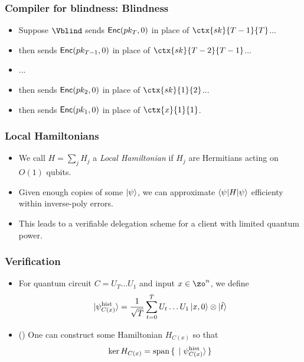 \documentclass{beamer}
\begin{document}
\begin{frame}
	\frametitle{Compiler for blindness: Blindness}
	\begin{itemize}[<+->]
		\item Suppose $\Vblind$ sends $\mathsf{Enc}(pk_T, 0)$ in place of $\ctx{sk}{T-1}{T}$...
		\item then sends $\mathsf{Enc}(pk_{T-1}, 0)$ in place of $\ctx{sk}{T-2}{T-1}$...
		\item ...
		\item then sends $\mathsf{Enc}(pk_2, 0)$ in place of $\ctx{sk}{1}{2}$...
		\item then sends $\mathsf{Enc}(pk_1, 0)$ in place of $\ctx{x}{1}{1}$.
	\end{itemize}
\end{frame}

\begin{frame}
	\frametitle{Local Hamiltonians}
	\begin{itemize}[<+->]
		\item We call $H=\sum_j H_j$ a \emph{Local Hamiltonian} if $H_j$ are Hermitians acting on $O(1)$ qubits.
		\item Given enough copies of some $\ket\psi$, we can approximate $\braket{\psi|H|\psi}$ efficienty within inverse-poly errors.
		\item This leads to a verifiable delegation scheme for a client with limited quantum power.
	\end{itemize}
\end{frame}

\begin{frame}
	\frametitle{Verification}
	\begin{itemize}[<+->]
		\item For quantum circuit $C=U_T\ldots U_1$ and input $x\in\zo^n$, we define $$\ket{\psi_{C(x)}^{\mathrm{hist}}}=\frac{1}{\sqrt{T}}\sum_{t=0}^TU_t\ldots U_1\ket{x,0}\otimes\ket{\hat{t}}$$
		\item (\cite{kitaev2002classical}) One can construct some Hamiltonian $H_{C(x)}$ so that $$\ker H_{C(x)}=\operatorname{span}\set{\ket{\psi_{C(x)}^{\mathrm{hist}}}}$$
	\end{itemize}
\end{frame}
\end{document}
